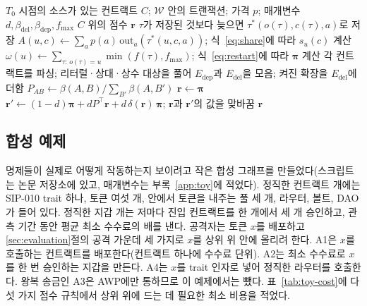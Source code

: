 \begin{algorithm}[htbp]
\caption{\PCER}
\label{alg:pcer}
\begin{algorithmic}[1]
\Require $T_0$ 시점의 소스가 있는 컨트랙트 $C$; $\mathcal{W}$ 안의 트랜잭션; 가격 $p$; 매개변수 $d,\beta_{\mathrm{del}},\beta_{\mathrm{dep}},f_{\max}$
\Ensure $C$ 위의 점수 $\mathbf{r}$
  \State $\tau$가 저장된 것보다 늦으면 $\tau^{*}(o(\tau),c(\tau),a)$로 저장
\EndFor
\State $A(u,c)\gets\sum_a p(a)\,\mathrm{out}_a(\tau^{*}(u,c,a))$; 식~\eqref{eq:share}에 따라 $s_u(c)$ 계산
\State $\omega(u)\gets\sum_{\tau:\,o(\tau)=u}\min(f(\tau),f_{\max})$; 식~\eqref{eq:restart}에 따라 $\boldsymbol{\pi}$ 계산
\State 각 컨트랙트를 파싱; 리터럴·상대·상수 대상을 풀어 $E_{\mathrm{dep}}$과 $E_{\mathrm{del}}$을 모음; 켜진 확장을 $E_{\mathrm{del}}$에 더함
\State $P_{AB}\gets\beta(A,B)/\sum_{B'}\beta(A,B')$
\State $\mathbf{r}\gets\boldsymbol{\pi}$
\Repeat
  \State $\mathbf{r}'\gets(1-d)\boldsymbol{\pi}+dP^{\top}\mathbf{r}+d\,\delta(\mathbf{r})\,\boldsymbol{\pi}$; $\mathbf{r}$과 $\mathbf{r}'$의 값을 맞바꿈
\State \Return $\mathbf{r}$
\end{algorithmic}
\end{algorithm}

\subsection{합성 예제}
\label{sec:method-toy}

명제들이 실제로 어떻게 작동하는지 보이려고 작은 합성 그래프를 만들었다(스크립트는 논문 저장소에 있고, 매개변수는 부록~\ref{app:toy}에 적었다). 정직한 컨트랙트 \ToyContracts 개에는 SIP-010 trait 하나, 토큰 여섯 개,  안에서 토큰을 내주는 풀 세 개, 라우터, 볼트, DAO가 들어 있다. 정직한 지갑 \ToyWallets 개는 저마다 진입 컨트랙트를 한 개에서 세 개 승인하고, 관측 기간 동안 평균 최소 수수료의 \ToyMeanFee 배를 낸다. 공격자는 토큰 $x$를 배포하고 \ref{sec:evaluation}절의 공격 가운데 세 가지로 $x$를 상위 \ToyTop 위 안에 올리려 한다. A1은 $x$를 호출하는 컨트랙트를 배포한다(컨트랙트 하나에 수수료 \ToyDeployFee 단위). A2는 최소 수수료로 $x$를 한 번 승인하는 지갑을 만든다. A4는 $x$를 trait 인자로 넣어 정직한 라우터를 호출한다. 왕복 송금인 A3은 AWP에만 통하므로 이 예제에서는 뺐다. 표~\ref{tab:toy-cost}에 다섯 가지 점수 규칙에서 상위 \ToyTop 위에 드는 데 필요한 최소 비용을 적었다.

\begin{table}[htbp]
\centering
\caption{정직한 컨트랙트 \ToyContracts 개로 된 합성 그래프에서 공격자 토큰을 상위 \ToyTop 위 안에 올리는 최소 공격 비용(최소 호출 수수료 단위). 공격 크기는 두 배씩 늘려 시험한 뒤 이분 탐색으로 좁히며, 공격이 커져도 토큰의 순위가 내려가지 않는다고 가정한다. 동점은 토큰에 유리하게 센다. ``도달 못 함''은 공격 크기가 200,000일 때도 토큰이 상위 \ToyTop 위 밖에 있다는 뜻이다. 그래프는 꾸며 낸 것이며, 이 표는 명제~\ref{prop:bipartite}--\ref{prop:region}의 예시일 뿐 Stacks 메인넷에 대한 결과가 아니다.}
\label{tab:toy-cost}
\small

\end{table}

